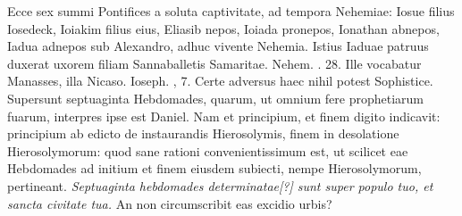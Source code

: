 Ecce sex summi Pontifices a soluta captivitate, ad tempora Nehemiae:
Iosue filius Iosedeck, Ioiakim filius eius, Eliasib nepos,
Ioiada pronepos, Ionathan abnepos, Iadua adnepos sub Alexandro,
adhuc vivente Nehemia.
Istius Iaduae patruus duxerat uxorem
filiam Sannaballetis Samaritae.
Nehem. . 28.
Ille vocabatur
Manasses, illa Nicaso.
Ioseph. , 7.
Certe adversus haec
nihil potest Sophistice.
Supersunt septuaginta Hebdomades, quarum,
ut omnium fere prophetiarum fuarum, interpres ipse est Daniel.
Nam et principium, et finem digito indicavit: principium ab
edicto de instaurandis Hierosolymis, finem in desolatione Hierosolymorum:
quod sane rationi convenientissimum est, ut scilicet eae
Hebdomades ad initium et finem eiusdem subiecti, nempe Hierosolymorum,
pertineant.
\textit{Septuaginta hebdomades determinatae[?] sunt
super populo tuo, et sancta civitate tua.}
An non circumscribit eas
excidio urbis?

